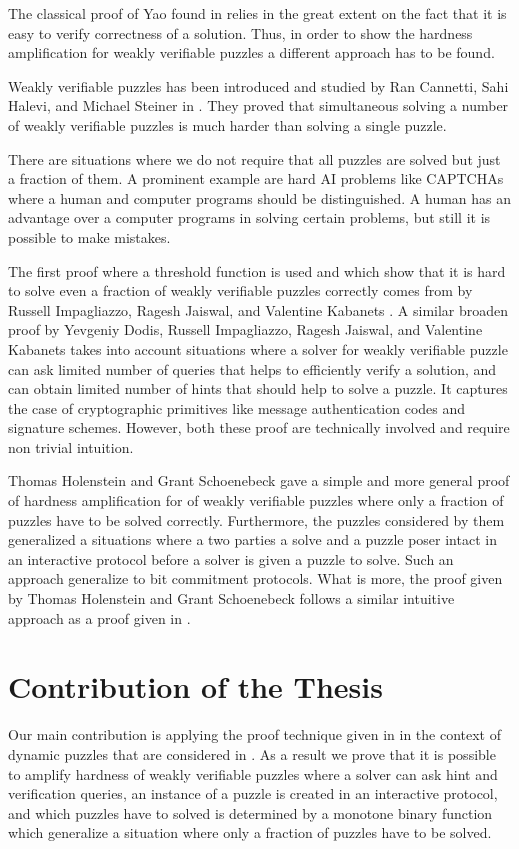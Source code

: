 \documentclass[11pt,a4paper,titlepage]{memoir}
\begin{document}
The classical proof of Yao found in \cite{Goldreich:2000:FCB:519078} relies in the great extent on the fact that
it is easy to verify correctness of a solution.
Thus, in order to show the hardness amplification for weakly verifiable puzzles a different approach has to be found.

Weakly verifiable puzzles has been introduced and studied by Ran Cannetti, Sahi Halevi, and Michael Steiner in \cite{canetti2004hardness}.
They proved that simultaneous solving a number of weakly verifiable puzzles is much harder than solving a single puzzle.

There are situations where we do not require that all puzzles are solved but just a fraction of them.
A prominent example are hard AI problems like CAPTCHAs where a human and computer programs should be distinguished.
A human has an advantage over a computer programs in solving certain problems, but still it is possible to make mistakes.

The first proof where a threshold function is used and which show that it is hard to solve even a fraction of weakly
verifiable puzzles correctly comes from by Russell Impagliazzo, Ragesh Jaiswal, and Valentine Kabanets \cite{impagliazzo2007chernoff}.
A similar broaden proof by Yevgeniy Dodis, Russell Impagliazzo, Ragesh Jaiswal, and Valentine Kabanets \cite{Dodis:2009:SAI:1530441.1530450}
takes into account situations where a solver for weakly verifiable puzzle can ask limited number of queries
that helps to efficiently verify a solution, and can obtain limited number of hints that should help to solve a puzzle.
It captures the case of cryptographic primitives like message authentication codes and signature schemes.
However, both these proof are technically involved and require non trivial intuition.

Thomas Holenstein and Grant Schoenebeck \cite{DBLP:journals/corr/abs-1002-3534} gave a simple and more general proof of hardness amplification for of weakly verifiable puzzles
where only a fraction of puzzles have to be solved correctly.
Furthermore, the puzzles considered by them generalized a situations where a two parties a solve and a puzzle poser intact in an interactive protocol before
a solver is given a puzzle to solve. Such an approach generalize to bit commitment protocols.
What is more, the proof given by Thomas Holenstein and Grant Schoenebeck follows a similar intuitive approach as a proof given in \cite{canetti2004hardness}.

\section{Contribution of the Thesis}
Our main contribution is applying the proof technique given in \cite{DBLP:journals/corr/abs-1002-3534}
in the context of dynamic puzzles that are considered in \cite{Dodis:2009:SAI:1530441.1530450}.
As a result we prove that it is possible to amplify hardness of weakly verifiable puzzles where a solver
can ask hint and verification queries, an instance of a puzzle is created in an interactive protocol, and
which puzzles have to solved is determined by a monotone binary function which generalize a situation where only
a fraction of puzzles have to be solved.
\end{document}
